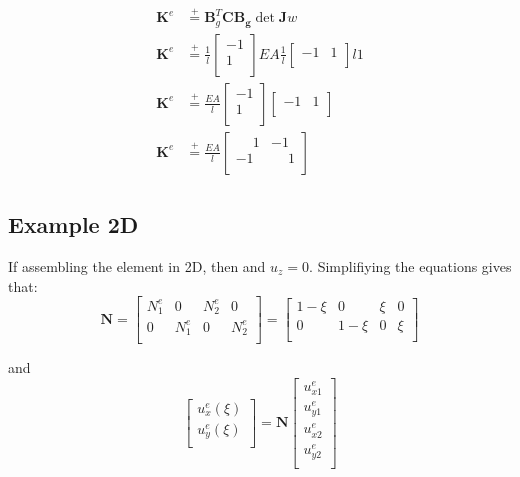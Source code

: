 \documentclass[10pt,b5paper,titlepage]{book}
\newcommand{\m}{\mathbf}
\newcommand*\eqp{\stackrel{+}{=}}
\newenvironment{eqarray}
{
    \begin{eqnarray}
        \begin{aligned}
}
{
        \end{aligned}
    \end{eqnarray}
}
\begin{document}
\begin{eqarray}
    \m{K}^e &\eqp \m{B}_g^T \m{C} \m{B_g} \det \m{J} w \\
    \m{K}^e &\eqp \frac{1}{l} \begin{bmatrix} -1 \\ 1 \\ \end{bmatrix}
                  EA
                  \frac{1}{l} \begin{bmatrix} -1 & 1 \\ \end{bmatrix}
                  l 1 \\
    \m{K}^e &\eqp \frac{EA}{l}
                  \begin{bmatrix} -1 \\ 1 \\ \end{bmatrix}
                  \begin{bmatrix} -1 & 1 \\ \end{bmatrix} \\
    \m{K}^e &\eqp \frac{EA}{l}
                  \begin{bmatrix}
                      \phantom{-}1 & -1 \\
                      -1 & \phantom{-}1 \\
                  \end{bmatrix}
\end{eqarray}


\subsection{Example 2D}
If assembling the element in 2D, then and $ u_z = 0 $.
Simplifiying the equations gives that:
\begin{equation}
    \m{N} = \begin{bmatrix}
        N_1^e & 0 & N_2^e & 0 \\
        0 & N_1^e & 0 & N_2^e \\
    \end{bmatrix}
    = \begin{bmatrix}
        1 - \xi & 0 & \xi & 0 \\
        0 & 1 - \xi & 0 & \xi \\
    \end{bmatrix}
\end{equation}

and
\begin{equation}
    \begin{bmatrix}
        u_x^e(\xi) \\
        u_y^e(\xi) \\
    \end{bmatrix}
    = \m{N} \begin{bmatrix}
        u_{x1}^e \\
        u_{y1}^e \\
        u_{x2}^e \\
        u_{y2}^e \\
    \end{bmatrix}
\end{equation}
\end{document}
